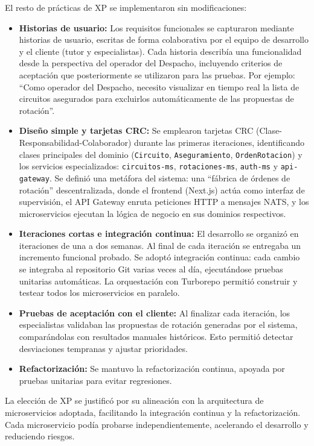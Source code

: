 El resto de prácticas de XP se implementaron sin modificaciones:
\begin{itemize}
    \item \textbf{Historias de usuario:} Los requisitos funcionales se capturaron mediante historias de usuario, escritas de forma colaborativa por el equipo de desarrollo y el cliente (tutor y especialistas). Cada historia describía una funcionalidad desde la perspectiva del operador del Despacho, incluyendo criterios de aceptación que posteriormente se utilizaron para las pruebas. Por ejemplo: “Como operador del Despacho, necesito visualizar en tiempo real la lista de circuitos asegurados para excluirlos automáticamente de las propuestas de rotación”.
    \item \textbf{Diseño simple y tarjetas CRC:} Se emplearon tarjetas CRC (Clase-Responsabilidad-Colaborador) durante las primeras iteraciones, identificando clases principales del dominio (\texttt{Circuito}, \texttt{Aseguramiento}, \texttt{OrdenRotacion}) y los servicios especializados: \texttt{circuitos-ms}, \texttt{rotaciones-ms}, \texttt{auth-ms} y \texttt{api-gateway}. Se definió una metáfora del sistema: una “fábrica de órdenes de rotación” descentralizada, donde el frontend (Next.js) actúa como interfaz de supervisión, el API Gateway enruta peticiones HTTP a mensajes NATS, y los microservicios ejecutan la lógica de negocio en sus dominios respectivos.
    \item \textbf{Iteraciones cortas e integración continua:} El desarrollo se organizó en iteraciones de una a dos semanas. Al final de cada iteración se entregaba un incremento funcional probado. Se adoptó integración continua: cada cambio se integraba al repositorio Git varias veces al día, ejecutándose pruebas unitarias automáticas. La orquestación con Turborepo permitió construir y testear todos los microservicios en paralelo.
    \item \textbf{Pruebas de aceptación con el cliente:} Al finalizar cada iteración, los especialistas validaban las propuestas de rotación generadas por el sistema, comparándolas con resultados manuales históricos. Esto permitió detectar desviaciones tempranas y ajustar prioridades.
    \item \textbf{Refactorización:} Se mantuvo la refactorización continua, apoyada por pruebas unitarias para evitar regresiones.
\end{itemize}

La elección de XP se justificó por su alineación con la arquitectura de microservicios adoptada, facilitando la integración continua y la refactorización. Cada microservicio podía probarse independientemente, acelerando el desarrollo y reduciendo riesgos.

